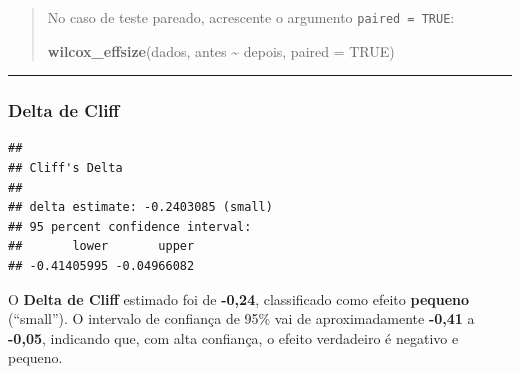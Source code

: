 \documentclass[
]{book}
\newenvironment{Shaded}{\begin{snugshade}}{\end{snugshade}}
\newcommand{\AttributeTok}[1]{\textcolor[rgb]{0.13,0.29,0.53}{#1}}
\newcommand{\CommentTok}[1]{\textcolor[rgb]{0.56,0.35,0.01}{\textit{#1}}}
\newcommand{\ConstantTok}[1]{\textcolor[rgb]{0.56,0.35,0.01}{#1}}
\newcommand{\FunctionTok}[1]{\textcolor[rgb]{0.13,0.29,0.53}{\textbf{#1}}}
\newcommand{\NormalTok}[1]{#1}
\newcommand{\SpecialCharTok}[1]{\textcolor[rgb]{0.81,0.36,0.00}{\textbf{#1}}}
\begin{document}
\begin{quote}
No caso de teste pareado, acrescente o argumento \texttt{paired\ =\ TRUE}:

\begin{Shaded}
\begin{Highlighting}[]
\FunctionTok{wilcox\_effsize}\NormalTok{(dados, antes }\SpecialCharTok{\textasciitilde{}}\NormalTok{ depois, }\AttributeTok{paired =} \ConstantTok{TRUE}\NormalTok{)}
\end{Highlighting}
\end{Shaded}
\end{quote}

\begin{center}\rule{0.5\linewidth}{0.5pt}\end{center}

\subsubsection{Delta de Cliff}\label{delta-de-cliff}

\begin{Shaded}
\end{Shaded}

\begin{verbatim}
## 
## Cliff's Delta
## 
## delta estimate: -0.2403085 (small)
## 95 percent confidence interval:
##       lower       upper 
## -0.41405995 -0.04966082
\end{verbatim}

O \textbf{Delta de Cliff} estimado foi de \textbf{-0,24}, classificado como efeito \textbf{pequeno} (``small''). O intervalo de confiança de 95\% vai de aproximadamente \textbf{-0,41} a \textbf{-0,05}, indicando que, com alta confiança, o efeito verdadeiro é negativo e pequeno.
\end{document}
